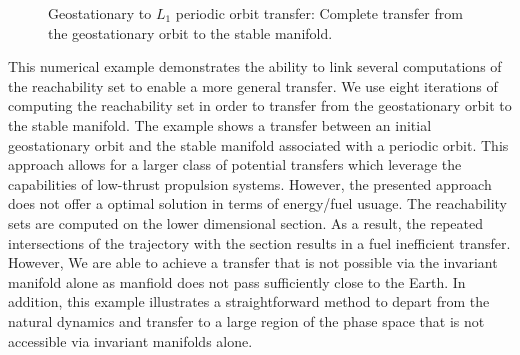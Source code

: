 \documentclass[smallcondensed]{svjour3}
\begin{document}
\begin{figure}

        \caption{Geostationary to \( L_1 \) periodic orbit transfer: Complete transfer from the geostationary orbit to the stable manifold.\label{fig:geo_transfer}}
\end{figure}

This numerical example demonstrates the ability to link several computations of the reachability set to enable a more general transfer.
We use eight iterations of computing the reachability set in order to transfer from the geostationary orbit to the stable manifold.
The example shows a transfer between an initial geostationary orbit and the stable manifold associated with a periodic orbit. 
This approach allows for a larger class of potential transfers which leverage the capabilities of low-thrust propulsion systems.
However, the presented approach does not offer a optimal solution in terms of energy/fuel usuage. 
The reachability sets are computed on the lower dimensional \Poincare section.
As a result, the repeated intersections of the trajectory with the \Poincare section results in a fuel inefficient transfer.
However, We are able to achieve a transfer that is not possible via the invariant manifold alone as manfiold does not pass sufficiently close to the Earth.
In addition, this example illustrates a straightforward method to depart from the natural dynamics and transfer to a large region of the phase space that is not accessible via invariant manifolds alone.
\end{document}
